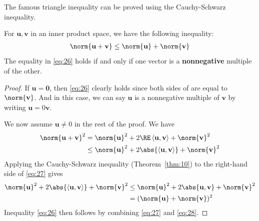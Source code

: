 \documentclass[thmcnt=section, color=blue, 12pt]{my-elegantbook}
\begin{document}

\par The famous triangle inequality can be proved using the Cauchy-Schwarz inequality.

\begin{theorem} \label{thm:7}
    For $\mathbf{u}, \mathbf{v}$ in an inner product space, we have the following inequality:
    \begin{align}
        \norm{\mathbf{u} + \mathbf{v}} \leq \norm{\mathbf{u}} + \norm{\mathbf{v}}
        \label{eq:26}
    \end{align}
    The equality in \eqref{eq:26} holds if and only if one vector is a \textbf{nonnegative} multiple of the other.
\end{theorem}

\begin{proof}
    If $\mathbf{u} = \mathbf{0}$, then \eqref{eq:26} clearly holds since both sides of are equal to $\norm{\mathbf{v}}$. And in this case, we can say $\mathbf{u}$ is a nonnegative multiple of $\mathbf{v}$ by writing $\mathbf{u} = 0 \mathbf{v}$.

    \par We now assume $\mathbf{u} \neq 0$ in the rest of the proof. We have 
    \begin{align}
        \norm{\mathbf{u} + \mathbf{v}}^2 
        &= \norm{\mathbf{u}}^2 + 2 \RE \left\langle \mathbf{u}, \mathbf{v} \right\rangle + \norm{\mathbf{v}}^2 \nonumber \\ 
        &\leq \norm{\mathbf{u}}^2 + 2 \abs{\left\langle \mathbf{u}, \mathbf{v} \right\rangle} + \norm{\mathbf{v}}^2
        \label{eq:27}
    \end{align}
    Applying the Cauchy-Schwarz inequality (Theorem~\ref{thm:10}) to the right-hand side of \eqref{eq:27} gives
    \begin{align}
        \norm{\mathbf{u}}^2 + 2 \abs{\left\langle \mathbf{u}, \mathbf{v} \right\rangle} + \norm{\mathbf{v}}^2
        &\leq \norm{\mathbf{u}}^2 + 2 \abs{\mathbf{u}, \mathbf{v}} + \norm{\mathbf{v}}^2 \nonumber \\
        &= (\norm{\mathbf{u}} + \norm{\mathbf{v}})^2
        \label{eq:28}
    \end{align}
    Inequality \eqref{eq:26} then follows by combining \eqref{eq:27} and \eqref{eq:28}.


\end{proof}
\end{document}
